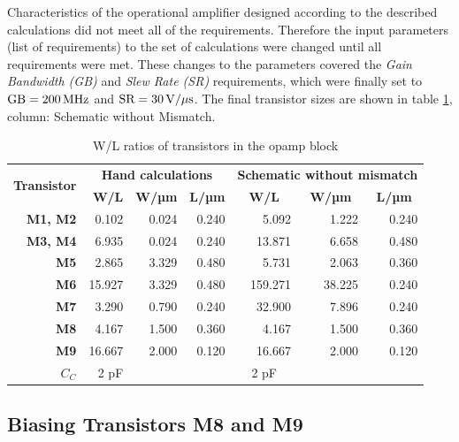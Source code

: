 \documentclass[parskip,oneside,colorbacktitle,10pt,accentcolor=tud1b]{tudreport}
\begin{document}
{Characteristics of the operational amplifier designed according to the described calculations did not meet all of the requirements. Therefore the input parameters (list of requirements) to the set of calculations were changed until all requirements were met. These changes to the parameters covered the \textit{Gain Bandwidth (GB)} and \textit{Slew Rate (SR)} requirements, which were finally set to $\text{GB} = \unit[200]{MHz}$ and $\text{SR} = \unit[30]{V/\mu s}$. The final transistor sizes are shown in table \ref{tab:opamp:wl}, column: \glqq Schematic without Mismatch\grqq.

\begin{table}[H]
  \centering
    \begin{tabular}{|r|r|r|r|r|r|r|}
    \hline
    \multicolumn{1}{|c|}{\multirow{2}[4]{*}{\textbf{Transistor}}} & \multicolumn{3}{c|}{\textbf{Hand calculations}} & \multicolumn{3}{c|}{\textbf{Schematic  without mismatch}}  \\
    \cline{2-7} \multicolumn{1}{|c|}{} & \textbf{W/L} & \textbf{W/µm} & \textbf{L/µm} & \multicolumn{1}{c|}{\textbf{W/L}} & \multicolumn{1}{c|}{\textbf{W/µm}} & \multicolumn{1}{c|}{\textbf{L/µm}} \\
    \hline
    \textbf{M1, M2} &  0.102  &  0.024  &  0.240  & 5.092 & 1.222 & 0.240 \\
    \hline
    \textbf{M3, M4} &  6.935  &  0.024  &  0.240  & 13.871 & 6.658 & 0.480 \\
    \hline
    \textbf{M5} &  2.865  &  3.329  &  0.480  & 5.731 & 2.063 & 0.360 \\
    \hline
    \textbf{M6} &  15.927  &  3.329  &  0.480  & 159.271 & 38.225 & 0.240 \\
    \hline
    \textbf{M7} &  3.290  &  0.790  &  0.240  & 32.900 & 7.896 & 0.240 \\
    \hline
    \textbf{M8} &  4.167 & 1.500  &  0.360  & 4.167 & 1.500 & 0.360 \\
    \hline
    \textbf{M9} &  16.667 & 2.000  &  0.120  & 16.667 & 2.000 & 0.120 \\
    \hline
    \textbf{$C_C$} & 2 pF &    &    & \multicolumn{1}{c|}{2 pF} & \multicolumn{1}{c|}{} & \multicolumn{1}{c|}{} \\
    \hline
    \end{tabular}
  \caption{W/L ratios of transistors in the opamp block}
  \label{tab:opamp:wl}
\end{table}

\subsection{Biasing Transistors M8 and M9}

}
\end{document}
